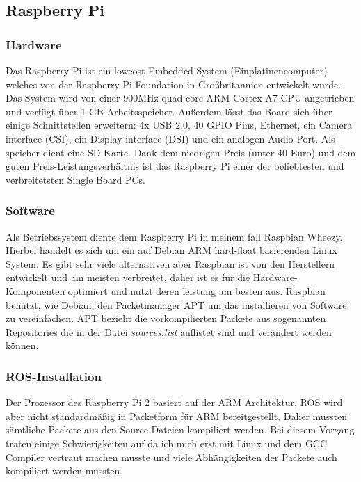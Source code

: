 \subsection{Raspberry Pi}



\subsubsection{Hardware}

 Das Raspberry Pi ist ein lowcost Embedded System (Einplatinencomputer) welches von der Raspberry Pi Foundation in Großbritannien entwickelt wurde.
 Das System wird von einer 900MHz quad-core ARM Cortex-A7 CPU angetrieben und verfügt über 1 GB Arbeitsspeicher.
 Außerdem lässt das Board sich über einige Schnittstellen erweitern: 4x USB 2.0, 40 GPIO Pins, Ethernet, ein Camera interface (CSI), ein Display interface (DSI) und ein analogen Audio Port. Als speicher dient eine SD-Karte.
 Dank dem niedrigen Preis (unter 40 Euro) und dem guten Preis-Leistungsverhältnis ist das Raspberry Pi einer der beliebtesten und verbreitetsten Single Board PCs.
 
\subsubsection{Software}

Als Betriebssystem diente dem Raspberry Pi in meinem fall Raspbian Wheezy. Hierbei handelt es sich um ein auf Debian ARM hard-float basierenden Linux System. Es gibt sehr viele alternativen aber Raspbian ist von den Herstellern entwickelt und am meisten verbreitet, daher ist es für die Hardware-Komponenten optimiert und nutzt deren leistung am besten aus.
Raspbian benutzt, wie Debian, den Packetmanager APT um das installieren von Software zu vereinfachen. APT bezieht die vorkompilierten Packete aus sogenannten Repositories die in der Datei \emph{sources.list} auflistet sind und verändert werden können. 

\subsubsection{ROS-Installation}

Der Prozessor des Raspberry Pi 2 basiert auf der ARM Architektur, ROS wird aber nicht standardmäßig in Packetform für ARM bereitgestellt. Daher mussten sämtliche Packete aus den Source-Dateien kompiliert werden. Bei diesem Vorgang traten einige Schwierigkeiten auf da ich mich erst mit Linux und dem GCC Compiler vertraut machen musste und viele Abhängigkeiten der Packete auch kompiliert werden mussten.

